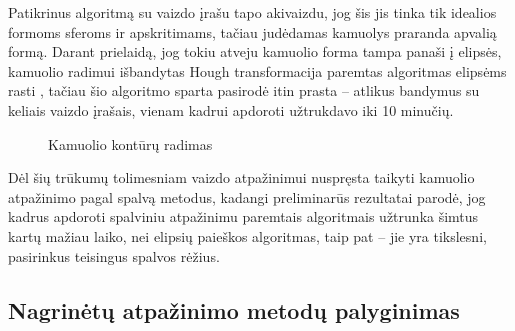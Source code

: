 \documentclass{VUMIFPSbakalaurinis}
\begin{document}
Patikrinus algoritmą su vaizdo įrašu tapo akivaizdu, jog šis jis tinka tik idealios formoms sferoms ir apskritimams, tačiau judėdamas kamuolys praranda apvalią formą. Darant prielaidą, jog tokiu atveju kamuolio forma tampa panaši į elipsės, kamuolio radimui išbandytas Hough transformacija paremtas algoritmas elipsėms rasti \cite{1048464}, tačiau šio algoritmo sparta pasirodė itin prasta – atlikus bandymus su keliais vaizdo įrašais, vienam kadrui apdoroti užtrukdavo iki 10 minučių.

\begin{figure}[H]
	\centering
	\qquad
	\caption{Kamuolio kontūrų radimas}
	\label{fig:contours}
\end{figure}

Dėl šių trūkumų tolimesniam vaizdo atpažinimui nuspręsta taikyti kamuolio atpažinimo pagal spalvą metodus, kadangi preliminarūs rezultatai parodė, jog kadrus apdoroti spalviniu atpažinimu paremtais algoritmais užtrunka šimtus kartų mažiau laiko, nei elipsių paieškos algoritmas, taip pat – jie yra tikslesni, pasirinkus teisingus spalvos rėžius. 

\subsection{Nagrinėtų atpažinimo metodų palyginimas}
\end{document}
